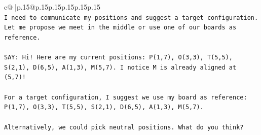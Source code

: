 \documentclass{article}
\begin{document}
{\begin{supertabular}{c@{$\;$}|p{.15\linewidth}@{}p{.15\linewidth}p{.15\linewidth}p{.15\linewidth}p{.15\linewidth}p{.15\linewidth}}
{{{\\ 
\texttt{I need to communicate my positions and suggest a target configuration. Let me propose we meet in the middle or use one of our boards as reference.} \\
\\ 
\texttt{SAY: Hi! Here are my current positions: P(1,7), O(3,3), T(5,5), S(2,1), D(6,5), A(1,3), M(5,7). I notice M is already aligned at (5,7)! } \\
\\ 
\texttt{For a target configuration, I suggest we use my board as reference: P(1,7), O(3,3), T(5,5), S(2,1), D(6,5), A(1,3), M(5,7). } \\
\\ 
\texttt{Alternatively, we could pick neutral positions. What do you think?} \\
            }
        }
    }
     \\ \\


\end{supertabular}}
\end{document}
